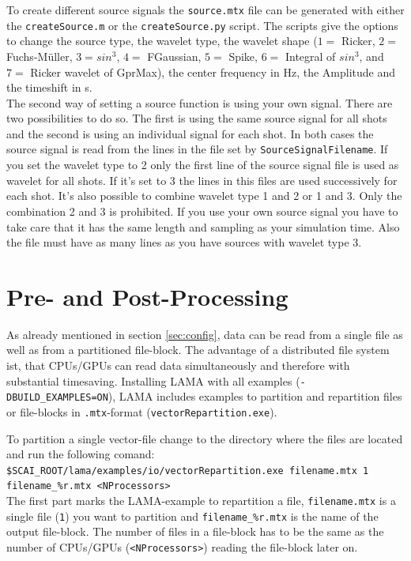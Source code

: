 \documentclass[pdftex,a4paper,parskip,listof=totoc,bibliography=totoc,onehalfspacing,12pt]{scrreprt}
\newcommand{\shellcmd}[1]{\indent\indent\texttt{#1}}	%
\newcommand{\shellcmdline}[1]{\indent\indent\texttt{\quad#1}} 	%
\begin{document}
To create different source signals the \shellcmd{source.mtx} file can be generated with either the \shellcmd{createSource.m} or the \shellcmd{createSource.py} script. The scripts give the options to change the source type, the wavelet type, the wavelet shape ($1=$ Ricker, $2=$ Fuchs-M\"uller, $3=sin^3$, $4=$ FGaussian, $5=$ Spike, $6=$ Integral of $sin^3$, and $7=$ Ricker wavelet of GprMax), the center frequency in Hz, the Amplitude and the timeshift in s.  \\
The second way of setting a source function is using your own signal. There are two possibilities to do so. The first is using the same source signal for all shots and the second is using an individual signal for each shot. In both cases the source signal is read from the lines in the file set by \verb+SourceSignalFilename+. If you set the wavelet type to 2 only the first line of the source signal file is used as wavelet for all shots. If it's set to 3 the lines in this files are used successively for each shot. It's also possible to combine wavelet type 1 and 2 or 1 and 3. Only the combination 2 and 3 is prohibited. If you use your own source signal you have to take care that it has the same length and sampling as your simulation time. Also the file must have as many lines as you have sources with wavelet type 3. 

\clearpage
\section{Pre- and Post-Processing}\label{sec:process}

As already mentioned in section \ref{sec:config}, data can be read from a single file as well as from a partitioned file-block. The advantage of a distributed file system ist, that CPUs/GPUs can read data simultaneously and therefore with substantial timesaving. Installing LAMA with all examples (\shellcmd{-DBUILD\_EXAMPLES=ON}), LAMA includes examples to partition and repartition files or file-blocks in \shellcmd{.mtx}-format (\shellcmd{vectorRepartition.exe}). 

To partition a single vector-file change to the directory where the files are located and run the following comand:  \\
\shellcmdline{\$SCAI\_ROOT/lama/examples/io/vectorRepartition.exe filename.mtx 1 }\\
\shellcmdline{filename\_\%r.mtx <NProcessors>}\\
The first part marks the LAMA-example to repartition a file, \shellcmd{filename.mtx} is a single file (\shellcmd{1}) you want to partition and \shellcmd{filename\_\%r.mtx} is the name of the output file-block. The number of files in a file-block has to be the same as the number of CPUs/GPUs (\shellcmd{<NProcessors>}) reading the file-block later on. 
\end{document}
